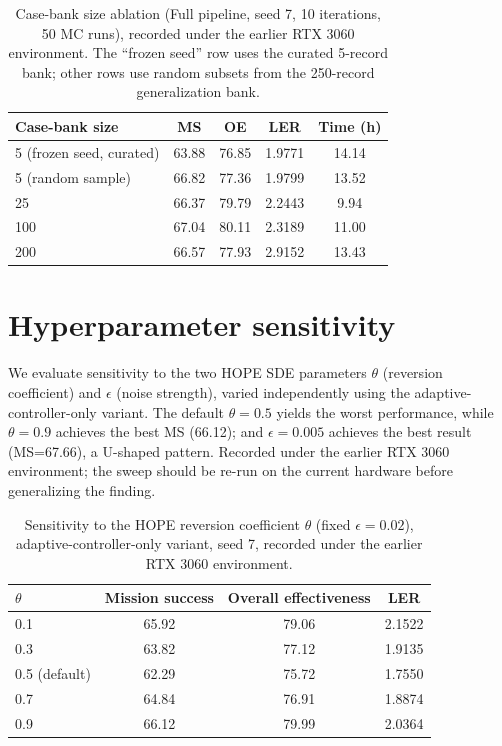 \begin{table}[ht]
\centering
\caption{Case-bank size ablation (Full pipeline, seed 7, 10 iterations, 50 MC runs), recorded under the earlier RTX 3060 environment. The ``frozen seed'' row uses the curated 5-record bank; other rows use random subsets from the 250-record generalization bank.}
\label{tab:casebank-ablation}
\small
\setlength{\tabcolsep}{5pt}
\begin{tabular}{lcccc}
\toprule
Case-bank size & MS & OE & LER & Time (h) \\
\midrule
5 (frozen seed, curated) & 63.88 & 76.85 & 1.9771 & 14.14 \\
5 (random sample) & 66.82 & 77.36 & 1.9799 & 13.52 \\
25 & 66.37 & 79.79 & 2.2443 & 9.94 \\
100 & 67.04 & 80.11 & 2.3189 & 11.00 \\
200 & 66.57 & 77.93 & 2.9152 & 13.43 \\
\bottomrule
\end{tabular}
\end{table}

\section{Hyperparameter sensitivity}
\label{app:hyperparam}

We evaluate sensitivity to the two HOPE SDE parameters $\theta$ (reversion coefficient) and $\epsilon$ (noise strength), varied independently using the adaptive-controller-only variant. The default $\theta=0.5$ yields the worst performance, while $\theta=0.9$ achieves the best MS (66.12); and $\epsilon=0.005$ achieves the best result (MS=67.66), a U-shaped pattern. Recorded under the earlier RTX 3060 environment; the sweep should be re-run on the current hardware before generalizing the finding.

\begin{table}[t]
\centering
\caption{Sensitivity to the HOPE reversion coefficient $\theta$ (fixed $\epsilon=0.02$), adaptive-controller-only variant, seed 7, recorded under the earlier RTX 3060 environment.}
\label{tab:hyperparam-theta}
\small
\begin{tabular}{lccc}
\toprule
$\theta$ & Mission success & Overall effectiveness & LER \\
\midrule
0.1 & 65.92 & 79.06 & 2.1522 \\
0.3 & 63.82 & 77.12 & 1.9135 \\
0.5 (default) & 62.29 & 75.72 & 1.7550 \\
0.7 & 64.84 & 76.91 & 1.8874 \\
0.9 & 66.12 & 79.99 & 2.0364 \\
\bottomrule
\end{tabular}
\end{table}

